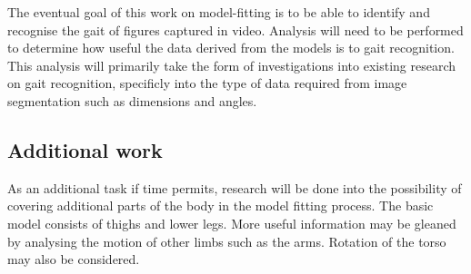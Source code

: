 The eventual goal of this work on model-fitting is to be able to identify and recognise the gait of figures captured in video.
Analysis will need to be performed to determine how useful the data derived from the models is to gait recognition.
This analysis will primarily take the form of investigations into existing research on gait recognition, specificly into the type of data required from image segmentation such as dimensions and angles.


\subsection{Additional work}

As an additional task if time permits, research will be done into the possibility of covering additional parts of the body in the model fitting process.
The basic model consists of thighs and lower legs.
More useful information may be gleaned by analysing the motion of other limbs such as the arms.
Rotation of the torso may also be considered.
